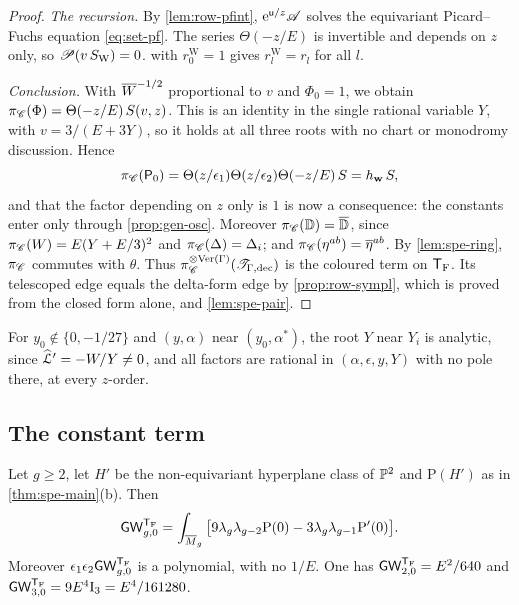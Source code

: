 \begin{proof}
\emph{The recursion.} By \cref{lem:row-pfint}, $\mathrm{e}^{\mathsf{u}/z}\mathscr{A}$ solves the equivariant Picard--Fuchs equation \eqref{eq:set-pf}. The series $\Theta(-z/E)$ is invertible and depends on $z$ only, so $\mathscr{P}(v\,S_{\mathrm{W}})=0$.  with $r^{\mathrm{W}}_0=1$ gives $r^{\mathrm{W}}_l=r_l$ for all $l$.

\emph{Conclusion.} With $\overline{W}^{-1/2}$ proportional to $v$ and $\Phi_0=1$, we obtain $\pi_{\mathscr{C}}(\Phi)=\Theta(-z/E)\,S(v,z)$. This is an identity in the single rational variable $Y$, with $v=3/(E+3Y)$, so it holds at all three roots with no chart or monodromy discussion. Hence
\[
\pi_{\mathscr{C}}(\mathsf{P}_0)=\Theta(z/\epsilon_1)\Theta(z/\epsilon_2)\Theta(-z/E)\,S=h_{\mathbf{w}}\,S,
\]
and that the factor depending on $z$ only is $1$ is now a consequence: the constants enter only through \cref{prop:gen-osc}. Moreover $\pi_{\mathscr{C}}(\mathbb{D})=\overline{\mathbb{D}}$, since $\pi_{\mathscr{C}}(W)=E(Y+E/3)^2$ and $\pi_{\mathscr{C}}(\Delta)=\Delta_i$; and $\pi_{\mathscr{C}}(\eta^{ab})=\overline{\eta}^{ab}$. By \cref{lem:spe-ring}, $\pi_{\mathscr{C}}$ commutes with $\theta$. Thus $\pi_{\mathscr{C}}^{\otimes\mathrm{Ver}(\Gamma)}(\mathscr{T}_{\Gamma,\mathrm{dec}})$ is the coloured term on $\mathsf{T}_{\mathrm{F}}$. Its telescoped edge equals the delta-form edge by \cref{prop:row-sympl}, which is proved from the closed form alone, and \cref{lem:spe-pair}.
\end{proof}

\begin{rmk}
\label{rmk:spe-analytic}
For $y_0\notin\{0,-1/27\}$ and $(y,\alpha)$ near $(y_0,\alpha^*)$, the root $Y$ near $Y_i$ is analytic, since $\widehat{\mathcal{L}}'=-W/Y\neq0$, and all factors are rational in $(\alpha,\epsilon,y,Y)$ with no pole there, at every $z$-order.
\end{rmk}

\subsection{The constant term}

\begin{prop}
\label{prop:spe-const}
Let $g\geq2$, let $H'$ be the non-equivariant hyperplane class of $\mathbb{P}^2$ and $\mathrm{P}(H')$ as in \cref{thm:spe-main}\textup{(b)}. Then
\[
\mathsf{GW}_{g,0}^{\mathsf{T}_{\mathrm{F}}}=\int_{\overline{M}_g}\big[9\lambda_g\lambda_{g-2}\mathrm{P}(0)-3\lambda_g\lambda_{g-1}\mathrm{P}'(0)\big].
\]
Moreover $\epsilon_1\epsilon_2\mathsf{GW}_{g,0}^{\mathsf{T}_{\mathrm{F}}}$ is a polynomial, with no $1/E$. One has $\mathsf{GW}_{2,0}^{\mathsf{T}_{\mathrm{F}}}=E^2/640$ and $\mathsf{GW}_{3,0}^{\mathsf{T}_{\mathrm{F}}}=9E^4\mathrm{I}_3=E^4/161280$.
\end{prop}

